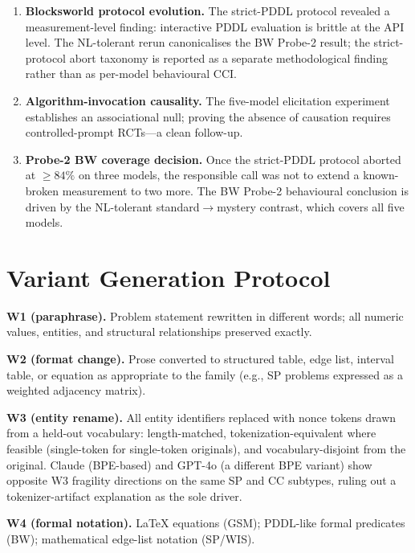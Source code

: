 \begin{enumerate}
  partial coverage. Section~\ref{sec:proximity}'s proximity-link observation
  is therefore one-model-strong by design; replicating on
  DeepSeek-R1~\citep{guo2025deepseek} or Qwen3 is the targeted next sweep.
  \item \textbf{Blocksworld protocol evolution.} The strict-PDDL protocol
  revealed a measurement-level finding: interactive PDDL evaluation is brittle
  at the API level. The NL-tolerant rerun canonicalises the BW Probe-2 result;
  the strict-protocol abort taxonomy is reported as a separate methodological
  finding rather than as per-model behavioural CCI.
  \item \textbf{Algorithm-invocation causality.} The five-model elicitation
  experiment establishes an associational null; proving the absence of
  causation requires controlled-prompt RCTs---a clean follow-up.
  \item \textbf{Probe-2 BW coverage decision.} Once the strict-PDDL protocol
  aborted at $\geq 84\%$ on three models, the responsible call was not to
  extend a known-broken measurement to two more. The BW Probe-2 behavioural
  conclusion is driven by the NL-tolerant standard$\to$mystery contrast,
  which covers all five models.
\end{enumerate}

\section{Variant Generation Protocol}
\label{app:variants}

\textbf{W1 (paraphrase).} Problem statement rewritten in different words; all
numeric values, entities, and structural relationships preserved exactly.

\textbf{W2 (format change).} Prose converted to structured table, edge list,
interval table, or equation as appropriate to the family (e.g., SP problems
expressed as a weighted adjacency matrix).

\textbf{W3 (entity rename).} All entity identifiers replaced with nonce
tokens drawn from a held-out vocabulary: length-matched,
tokenization-equivalent where feasible (single-token for single-token
originals), and vocabulary-disjoint from the original. Claude (BPE-based) and
GPT-4o (a different BPE variant) show opposite W3 fragility directions on the
same SP and CC subtypes, ruling out a tokenizer-artifact explanation as the
sole driver.

\textbf{W4 (formal notation).} LaTeX equations (GSM); PDDL-like formal
predicates (BW); mathematical edge-list notation (SP/WIS).

